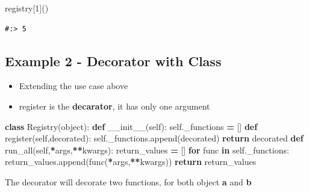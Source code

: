 \documentclass[
]{book}
\newenvironment{Shaded}{\begin{snugshade}}{\end{snugshade}}
\newcommand{\BuiltInTok}[1]{#1}
\newcommand{\ControlFlowTok}[1]{\textcolor[rgb]{0.27,0.27,0.27}{\textbf{#1}}}
\newcommand{\DecValTok}[1]{\textcolor[rgb]{0.06,0.06,0.06}{#1}}
\newcommand{\FunctionTok}[1]{\textcolor[rgb]{0,0,0}{#1}}
\newcommand{\KeywordTok}[1]{\textcolor[rgb]{0.27,0.27,0.27}{\textbf{#1}}}
\newcommand{\NormalTok}[1]{#1}
\newcommand{\OperatorTok}[1]{\textcolor[rgb]{0.43,0.43,0.43}{\textbf{#1}}}
\newcommand{\VariableTok}[1]{\textcolor[rgb]{0,0,0}{#1}}
\providecommand{\tightlist}{%
  \setlength{\itemsep}{0pt}\setlength{\parskip}{0pt}}
\begin{document}
\begin{Shaded}
\begin{Highlighting}[]
\NormalTok{registry[}\DecValTok{1}\NormalTok{]()}
\end{Highlighting}
\end{Shaded}

\begin{verbatim}
#:> 5
\end{verbatim}

\hypertarget{example-2---decorator-with-class}{%
\subsection{Example 2 - Decorator with Class}\label{example-2---decorator-with-class}}

\begin{itemize}
\tightlist
\item
  Extending the use case above
\item
  register is the \textbf{decarator}, it has only one argument
\end{itemize}

\begin{Shaded}
\begin{Highlighting}[]
\KeywordTok{class}\NormalTok{ Registry(}\BuiltInTok{object}\NormalTok{):}
    \KeywordTok{def} \FunctionTok{__init__}\NormalTok{(}\VariableTok{self}\NormalTok{):}
        \VariableTok{self}\NormalTok{._functions }\OperatorTok{=}\NormalTok{ []}
    \KeywordTok{def}\NormalTok{ register(}\VariableTok{self}\NormalTok{,decorated):}
        \VariableTok{self}\NormalTok{._functions.append(decorated)}
        \ControlFlowTok{return}\NormalTok{ decorated}
    \KeywordTok{def}\NormalTok{ run_all(}\VariableTok{self}\NormalTok{,}\OperatorTok{*}\NormalTok{args,}\OperatorTok{**}\NormalTok{kwargs):}
\NormalTok{        return_values }\OperatorTok{=}\NormalTok{ []}
        \ControlFlowTok{for}\NormalTok{ func }\KeywordTok{in} \VariableTok{self}\NormalTok{._functions:}
\NormalTok{            return_values.append(func(}\OperatorTok{*}\NormalTok{args,}\OperatorTok{**}\NormalTok{kwargs))}
        \ControlFlowTok{return}\NormalTok{ return_values}
\end{Highlighting}
\end{Shaded}

The decorator will decorate two functions, for both object \textbf{a} and \textbf{b}
\end{document}
